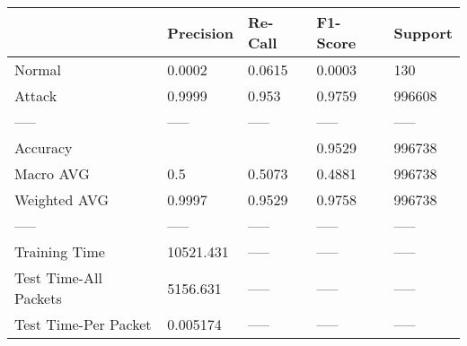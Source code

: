 \begin{tabular}{lllll}
\toprule
{} &  Precision & Re-Call & F1-Score & Support \\
\midrule
Normal                &     0.0002 &  0.0615 &   0.0003 &     130 \\
Attack                &     0.9999 &   0.953 &   0.9759 &  996608 \\
-----                 &      ----- &   ----- &    ----- &   ----- \\
Accuracy              &            &         &   0.9529 &  996738 \\
Macro AVG             &        0.5 &  0.5073 &   0.4881 &  996738 \\
Weighted AVG          &     0.9997 &  0.9529 &   0.9758 &  996738 \\
-----                 &      ----- &   ----- &    ----- &   ----- \\
Training Time         &  10521.431 &   ----- &    ----- &   ----- \\
Test Time-All Packets &   5156.631 &   ----- &    ----- &   ----- \\
Test Time-Per Packet  &   0.005174 &   ----- &    ----- &   ----- \\
\bottomrule
\end{tabular}
